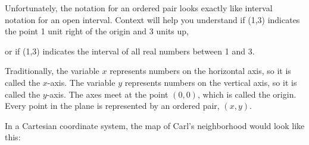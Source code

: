 \documentclass{ximera}
\begin{document}
\begin{remark}
Unfortunately, the notation for an ordered pair looks exactly like interval notation for an open interval. Context will help you understand if (1,3) indicates the point 1 unit right of the origin and 3 units up,

\begin{image}
\end{image}

 or if (1,3) indicates the interval of all real numbers between 1 and 3.

\begin{image}
\end{image}
\end{remark} 

Traditionally, the variable $x$ represents numbers on the horizontal axis, so it is called the $x$-axis. The variable $y$ represents numbers on the vertical axis, so it is called the $y$-axis.  The axes meet at the point $(0,0)$, which is called the origin. Every point in the plane is represented by an ordered pair, $(x,y)$.  

In a Cartesian coordinate system, the map of Carl's neighborhood would look like this:

\begin{image}
\end{image}
\end{document}
